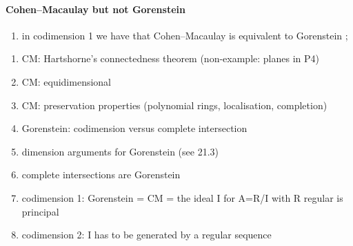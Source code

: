 \documentclass[10pt,a4paper]{article}
\begin{document}
\paragraph{Cohen--Macaulay but not Gorenstein}

\begin{enumerate}
  \item in codimension 1 we have that Cohen--Macaulay is equivalent to Gorenstein \cite[corollary 21.20]{eisenbud-commutative-algebra};
\end{enumerate}



\begin{enumerate}
  \item CM: Hartshorne's connectedness theorem (non-example: planes in P4)
  \item CM: equidimensional
  \item CM: preservation properties (polynomial rings, localisation, completion)
  \item Gorenstein: codimension versus complete intersection
  \item dimension arguments for Gorenstein (see 21.3)
  \item complete intersections are Gorenstein
  \item codimension 1: Gorenstein = CM = the ideal I for A=R/I with R regular is principal
  \item codimension 2: I has to be generated by a regular sequence
\end{enumerate}

\printbibliography
\end{document}
